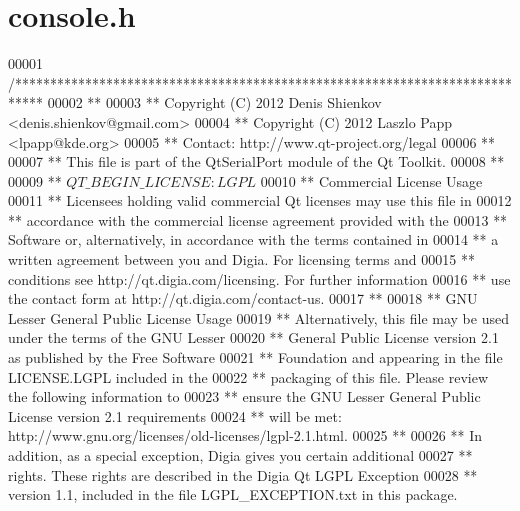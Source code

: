 \hypertarget{a00033_source}{\section{console.\+h}
\label{a00033_source}
}

\begin{DoxyCode}
00001 \textcolor{comment}{/****************************************************************************}
00002 \textcolor{comment}{**}
00003 \textcolor{comment}{** Copyright (C) 2012 Denis Shienkov <denis.shienkov@gmail.com>}
00004 \textcolor{comment}{** Copyright (C) 2012 Laszlo Papp <lpapp@kde.org>}
00005 \textcolor{comment}{** Contact: http://www.qt-project.org/legal}
00006 \textcolor{comment}{**}
00007 \textcolor{comment}{** This file is part of the QtSerialPort module of the Qt Toolkit.}
00008 \textcolor{comment}{**}
00009 \textcolor{comment}{** $QT\_BEGIN\_LICENSE:LGPL$}
00010 \textcolor{comment}{** Commercial License Usage}
00011 \textcolor{comment}{** Licensees holding valid commercial Qt licenses may use this file in}
00012 \textcolor{comment}{** accordance with the commercial license agreement provided with the}
00013 \textcolor{comment}{** Software or, alternatively, in accordance with the terms contained in}
00014 \textcolor{comment}{** a written agreement between you and Digia.  For licensing terms and}
00015 \textcolor{comment}{** conditions see http://qt.digia.com/licensing.  For further information}
00016 \textcolor{comment}{** use the contact form at http://qt.digia.com/contact-us.}
00017 \textcolor{comment}{**}
00018 \textcolor{comment}{** GNU Lesser General Public License Usage}
00019 \textcolor{comment}{** Alternatively, this file may be used under the terms of the GNU Lesser}
00020 \textcolor{comment}{** General Public License version 2.1 as published by the Free Software}
00021 \textcolor{comment}{** Foundation and appearing in the file LICENSE.LGPL included in the}
00022 \textcolor{comment}{** packaging of this file.  Please review the following information to}
00023 \textcolor{comment}{** ensure the GNU Lesser General Public License version 2.1 requirements}
00024 \textcolor{comment}{** will be met: http://www.gnu.org/licenses/old-licenses/lgpl-2.1.html.}
00025 \textcolor{comment}{**}
00026 \textcolor{comment}{** In addition, as a special exception, Digia gives you certain additional}
00027 \textcolor{comment}{** rights.  These rights are described in the Digia Qt LGPL Exception}
00028 \textcolor{comment}{** version 1.1, included in the file LGPL\_EXCEPTION.txt in this package.}

\end{DoxyCode}
